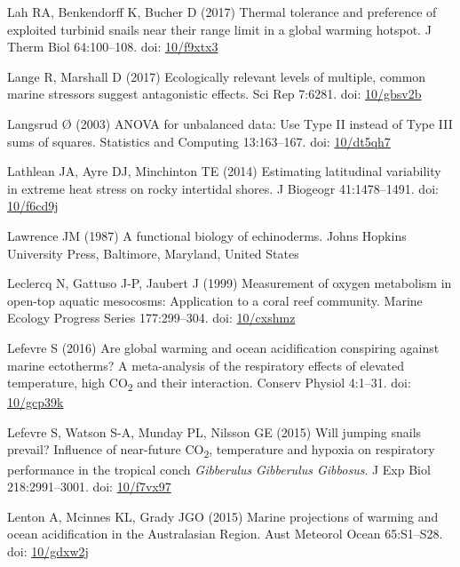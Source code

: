 \documentclass[a4paper,10pt, oneside]{memoir}
\begin{document}
\leavevmode\hypertarget{ref-Lah2017}{}%
Lah RA, Benkendorff K, Bucher D (2017) Thermal tolerance and preference of exploited turbinid snails near their range limit in a global warming hotspot. J Therm Biol 64:100--108. doi: \href{https://doi.org/10/f9xtx3}{10/f9xtx3}

\leavevmode\hypertarget{ref-Lange2017}{}%
Lange R, Marshall D (2017) Ecologically relevant levels of multiple, common marine stressors suggest antagonistic effects. Sci Rep 7:6281. doi: \href{https://doi.org/10/gbsv2b}{10/gbsv2b}

\leavevmode\hypertarget{ref-Langsrud2003}{}%
Langsrud Ø (2003) ANOVA for unbalanced data: Use Type II instead of Type III sums of squares. Statistics and Computing 13:163--167. doi: \href{https://doi.org/10/dt5qh7}{10/dt5qh7}

\leavevmode\hypertarget{ref-Lathlean2014}{}%
Lathlean JA, Ayre DJ, Minchinton TE (2014) Estimating latitudinal variability in extreme heat stress on rocky intertidal shores. J Biogeogr 41:1478--1491. doi: \href{https://doi.org/10/f6cd9j}{10/f6cd9j}

\leavevmode\hypertarget{ref-Lawrence1987}{}%
Lawrence JM (1987) A functional biology of echinoderms. Johns Hopkins University Press, Baltimore, Maryland, United States

\leavevmode\hypertarget{ref-Leclercq1999}{}%
Leclercq N, Gattuso J-P, Jaubert J (1999) Measurement of oxygen metabolism in open-top aquatic mesocosms: Application to a coral reef community. Marine Ecology Progress Series 177:299--304. doi: \href{https://doi.org/10/cxshmz}{10/cxshmz}

\leavevmode\hypertarget{ref-Lefevre2016}{}%
Lefevre S (2016) Are global warming and ocean acidification conspiring against marine ectotherms? A meta-analysis of the respiratory effects of elevated temperature, high CO\textsubscript{2} and their interaction. Conserv Physiol 4:1--31. doi: \href{https://doi.org/10/gcp39k}{10/gcp39k}

\leavevmode\hypertarget{ref-Lefevre2015}{}%
Lefevre S, Watson S-A, Munday PL, Nilsson GE (2015) Will jumping snails prevail? Influence of near-future CO\textsubscript{2}, temperature and hypoxia on respiratory performance in the tropical conch \emph{Gibberulus} \emph{Gibberulus Gibbosus}. J Exp Biol 218:2991--3001. doi: \href{https://doi.org/10/f7vx97}{10/f7vx97}

\leavevmode\hypertarget{ref-Lenton2015}{}%
Lenton A, Mcinnes KL, Grady JGO (2015) Marine projections of warming and ocean acidification in the Australasian Region. Aust Meteorol Ocean 65:S1--S28. doi: \href{https://doi.org/10/gdxw2j}{10/gdxw2j}
\end{document}
